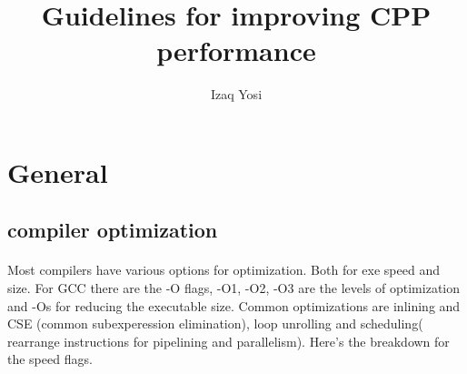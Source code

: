 \documentclass{article}
\author{Izaq Yosi}
\title{Guidelines for improving CPP performance }
\begin{document}
\maketitle
\tableofcontents

\section {General}

 \subsection{compiler optimization}
 \paragraph{}
 Most compilers have various options for optimization. Both for exe speed and size.  
 For GCC there are the -O flags, -O1, -O2, -O3 are the levels of optimization and -Os for reducing the executable size. 
 Common optimizations are inlining and CSE (common subexperession elimination), loop unrolling and scheduling( rearrange instructions for pipelining and parallelism).
 Here's the breakdown for the speed flags.
\end{document}
